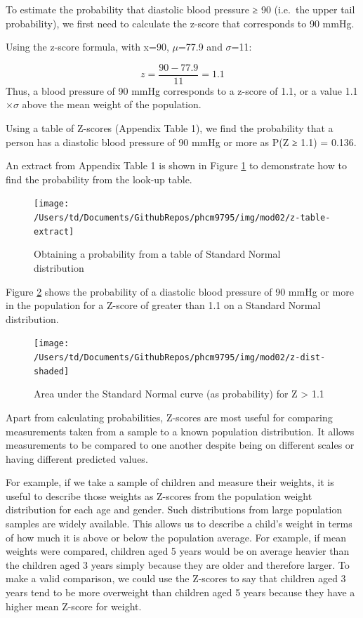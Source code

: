 \documentclass[
]{memoir}
\begin{document}
To estimate the probability that diastolic blood pressure ≥ 90 (i.e.~the upper tail probability), we first need to calculate the z-score that corresponds to 90 mmHg.

Using the z-score formula, with x=90, \(\mu\)=77.9 and \(\sigma\)=11:

\[ z = \frac{90 - 77.9}{11} = 1.1 \]
Thus, a blood pressure of 90 mmHg corresponds to a z-score of 1.1, or a value 1.1 \(\times \sigma\) above the mean weight of the population.

Using a table of Z-scores (Appendix Table 1), we find the probability that a person has a diastolic blood pressure of 90 mmHg or more as P(Z ≥ 1.1) = 0.136.

An extract from Appendix Table 1 is shown in Figure \ref{fig:fig-2-4} to demonstrate how to find the probability from the look-up table.

\begin{figure}
\texttt{[image: /Users/td/Documents/GithubRepos/phcm9795/img/mod02/z-table-extract]} \caption{Obtaining a probability from a table of Standard Normal distribution}\label{fig:fig-2-4}
\end{figure}

Figure \ref{fig:fig-2-5} shows the probability of a diastolic blood pressure of 90 mmHg or more in the population for a Z-score of greater than 1.1 on a Standard Normal distribution.

\begin{figure}
\texttt{[image: /Users/td/Documents/GithubRepos/phcm9795/img/mod02/z-dist-shaded]} \caption{Area under the Standard Normal curve (as probability) for Z > 1.1}\label{fig:fig-2-5}
\end{figure}

Apart from calculating probabilities, Z-scores are most useful for comparing measurements taken from a sample to a known population distribution. It allows measurements to be compared to one another despite being on different scales or having different predicted values.

For example, if we take a sample of children and measure their weights, it is useful to describe those weights as Z-scores from the population weight distribution for each age and gender. Such distributions from large population samples are widely available. This allows us to describe a child's weight in terms of how much it is above or below the population average. For example, if mean weights were compared, children aged 5 years would be on average heavier than the children aged 3 years simply because they are older and therefore larger. To make a valid comparison, we could use the Z-scores to say that children aged 3 years tend to be more overweight than children aged 5 years because they have a higher mean Z-score for weight.
\end{document}

